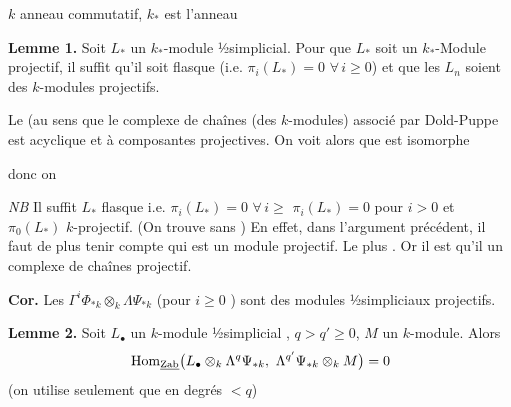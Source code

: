 \documentclass[11pt,a4paper]{article}
\begin{document}

$k$ anneau commutatif, $k_{*}$ est l'anneau  \ill{}

\textbf{Lemme 1.} Soit $L_{*}$ un $k_{*}$-module ½simplicial. Pour que $L_{*}$
soit un $k_{*}$-Module projectif, il suffit qu'il soit flasque (i.e.
$\pi_{i}(L_{*}) = 0$ $\forall\, i \geqslant 0$) et que les $L_{n}$ soient des
$k$-modules projectifs.
\marginal{\ill{}}

Le  \ill{} (au sens \ill{} que le complexe de chaînes
(des $k$-modules) associé par Dold-Puppe \ill{} est acyclique et à
composantes projectives. On voit alors que \ill{} est isomorphe \ill{}

donc on \ill{}

\emph{NB} Il suffit \ill{} $L_{*}$ flasque i.e. $\pi_{i}(L_{*}) = 0$
$\forall\, i \geqslant$ \ill{} \ill{} $\pi_{i}(L_{*}) = 0$ pour $i > 0$ et
$\pi_{0}(L_{*})$ $k$-projectif. (On trouve \ill{} sans \ill{}) En effet,
dans l'argument précédent, il faut de plus tenir compte \ill{} \ill{} qui est
un module projectif. Le plus \ill{}. Or il est \ill{} qu'il \ill{} un
complexe \ill{} de chaînes projectif.

\textbf{Cor.} Les $\Gamma^{i}\Phi_{*k} \otimes_{k} \Lambda\Psi_{*k}$
 (pour
$i \geqslant 0$ \ill{}) sont des modules ½simpliciaux projectifs.

\textbf{Lemme 2.} Soit $L_{\bullet}$ un $k$-module ½simplicial \ill{}
, $q > q' \geqslant 0$, $M$ un
$k$-module. Alors
\[
  \operatorname{Hom}_{\uncertain{\mathrm{Zab}}}\bigl(L_{\bullet} \otimes_{k}
  \Lambda^{q}\Psi_{*k},\ \Lambda^{q'}\Psi_{*k} \otimes_{k} M\bigr) = 0
\]
(on utilise seulement que \ill{} \ill{} en degrés $< q$)

\end{document}
